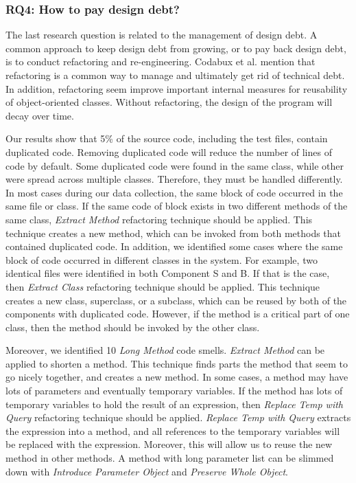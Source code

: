 
\subsubsection{RQ4: How to pay design debt?} 
The last research question is related to the management of design debt. A common approach to keep design debt from growing, or to pay back design debt, is to conduct refactoring and re-engineering. Codabux et al.\cite{p8-codabux} mention that refactoring is a common way to manage and ultimately get rid of technical debt. In addition, refactoring seem improve important internal measures for reusability of object-oriented classes\cite{moser2006does}. Without refactoring, the design of the program will decay over time. 

Our results show that 5\% of the source code, including the test files, contain duplicated code. Removing duplicated code will reduce the number of lines of code by default. Some duplicated code were found in the same class, while other were spread across multiple classes. Therefore, they must be handled differently. In most cases during our data collection, the same block of code occurred in the same file or class. If the same code of block exists in two different methods of the same class, \textit{Extract Method} refactoring technique should be applied. This technique creates a new method, which can be invoked from both methods that contained duplicated code\cite{fowler1999refactoring}. In addition, we identified some cases where the same block of code occurred in different classes in the system. For example, two identical files were identified in both Component S and B. If that is the case, then \textit{Extract Class} refactoring technique should be applied. This technique creates a new class, superclass, or a subclass, which can be reused by both of the components with duplicated code. However, if the method is a critical part of one class, then the method should be invoked by the other class.

Moreover, we identified 10 \textit{Long Method} code smells. \textit{Extract Method} can be applied to shorten a method. This technique finds parts the method that seem to go nicely together, and creates a new method\cite{fowler1999refactoring}. In some cases, a method may have lots of parameters and eventually temporary variables. If the method has lots of temporary variables to hold the result of an expression, then \textit{Replace Temp with Query} refactoring technique should be applied\cite{fowler1999refactoring}. \textit{Replace Temp with Query} extracts the expression into a method, and all references to the temporary variables will be replaced with the expression. Moreover, this will allow us to reuse the new method in other methods. A method with long parameter list can be slimmed down with \textit{Introduce Parameter Object} and \textit{Preserve Whole Object}\cite{fowler1999refactoring}.

